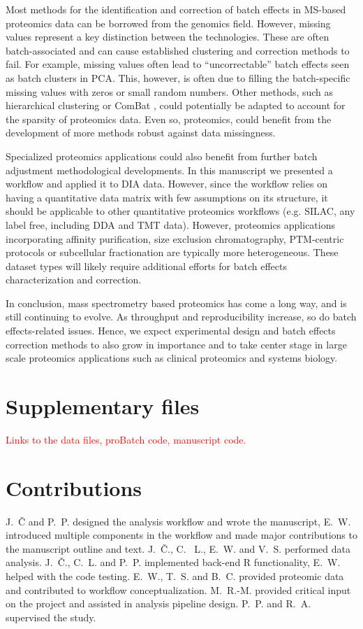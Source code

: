 \documentclass[num-refs]{wiley-article}
\begin{document}
Most methods for the identification and correction of batch effects in MS-based proteomics data can be borrowed from the genomics field. However, missing values represent a key distinction between the technologies. These are often batch-associated and can cause established clustering and correction methods to fail. For example, missing values often lead to “uncorrectable” batch effects seen as batch clusters in PCA. This, however, is often due to filling the batch-specific missing values with zeros or small random numbers. Other methods, such as hierarchical clustering or ComBat \cite{Johnston2005a}, could potentially be adapted to account for the sparsity of proteomics data. Even so, proteomics, could benefit from the development of more methods robust against data missingness.

Specialized proteomics applications could also benefit from further batch adjustment methodological developments. In this manuscript we presented a workflow and applied it to DIA data. However, since the workflow relies on having a quantitative data matrix with few assumptions on its structure, it should be applicable to other quantitative proteomics workflows (e.g. SILAC, any label free, including DDA and TMT data). However, proteomics applications incorporating affinity purification, size exclusion chromatography, PTM-centric protocols or subcellular fractionation are typically more heterogeneous. These dataset types will likely require additional efforts for batch effects characterization and correction.

In conclusion, mass spectrometry based proteomics has come a long way, and is still continuing to evolve. As throughput and reproducibility increase, so do batch effects-related issues. Hence, we expect experimental design and batch effects correction methods to also grow in importance and to take center stage in  large scale proteomics applications such as clinical proteomics and systems biology.


\section*{Supplementary files}
\textcolor{red}{Links to the data files, proBatch code, manuscript code.}

\section*{Contributions}
J.~Č and P.~P. designed the analysis workflow and wrote the manuscript, E.~W. introduced multiple components in the workflow and made major contributions to the manuscript outline and text. J.~Č., C. ~L., E.~W. and V.~S. performed data analysis. J.~Č., C.~L. and P.~P. implemented back-end R functionality, E.~W. helped with the code testing. E.~W., T.~S. and B.~C. provided proteomic data and contributed to workflow conceptualization. M.~R.-M. provided critical input on the project and assisted in analysis pipeline design. P.~P. and R.~A. supervised the study.
\end{document}
